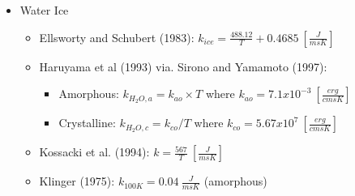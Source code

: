 \documentclass[11pt]{article} %
\begin{document}
\begin{itemize}
	\begin{itemize}
	\item Water Ice
		\begin{itemize}
		\item Ellsworty and Schubert (1983): $k_{ice} = \frac{488.12}{T} +0.4685 \: [\frac{J}{m s K}]$
		\item Haruyama et al (1993) via. Sirono and Yamamoto (1997):
			\begin{itemize}
			\item Amorphous: $k_{H_{2}O, a} = k_{ao} \times T$ where $k_{ao} = 7.1x10^{-3} \: [\frac{erg}{cm s K}]$
			\item Crystalline: $k_{H_{2}O, c} = k_{co}/T$ where $k_{co} = 5.67x10^{7} \: [\frac{erg}{cm s K}]$
			\end{itemize}
		\item Kossacki et al. (1994): $k = \frac{567}{T} \: [\frac{J}{m s K}]$
		\item Klinger (1975): $k_{100 K} = 0.04  \: \frac{J}{m s K}$ (amorphous)
		\end{itemize}
	\end{itemize}


\end{itemize}
\end{document}
